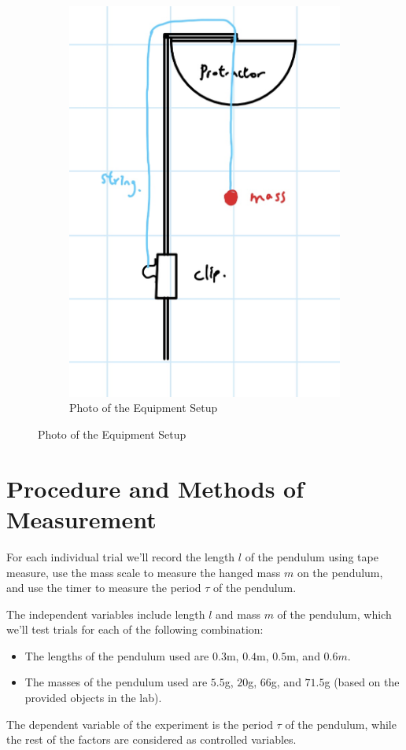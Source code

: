 \documentclass{article}
\begin{document}
\begin{figure}[h!]
\begin{subfigure}[t]{0.3\textwidth}
        \includegraphics[width=\linewidth]{setup_sketch.png}
        \caption{Photo of the Equipment Setup}
        \label{fig:physical_setup}
    \end{subfigure}
\end{figure}

\pagebreak

\section{Procedure and Methods of Measurement}
For each individual trial we'll record the length $l$ of the pendulum using tape measure, use the mass scale to measure the hanged mass $m$ on the pendulum, and use the timer to measure the period $\tau$ of the pendulum.

The independent variables include length $l$ and mass $m$ of the pendulum, which we'll test trials for each of the following combination:
\begin{itemize}
    \item The lengths of the pendulum used are $0.3$m, $0.4$m, $0.5$m, and $0.6m$. 
    \item The masses of the pendulum used are $5.5$g, $20$g, $66$g, and $71.5$g (based on the provided objects in the lab). 
\end{itemize}
The dependent variable of the experiment is the period $\tau$ of the pendulum, while the rest of the factors are considered as controlled variables.
\end{document}
